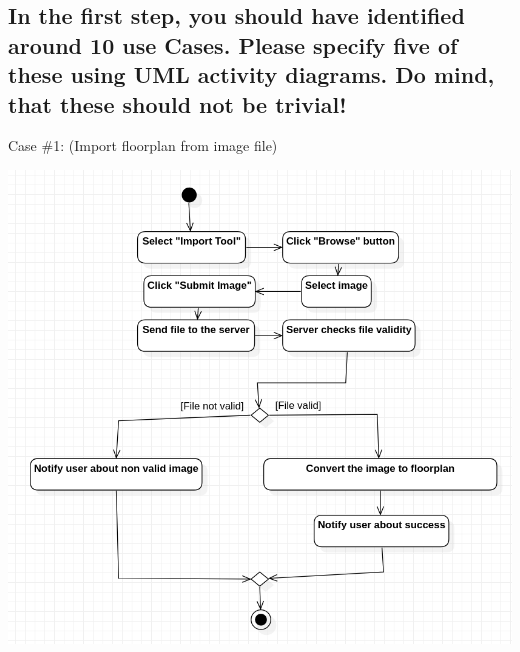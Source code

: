 		\clearpage
			
			
		\subsection{In the first step, you should have identified around 10 use Cases. Please specify
			five of these using UML activity diagrams. Do mind, that these should not be
			trivial!}
		
            \noindent Case \#1:
            (Import floorplan from image file)
            
            \includegraphics[width=\textwidth]{images/j_UseCase1.png}
            

